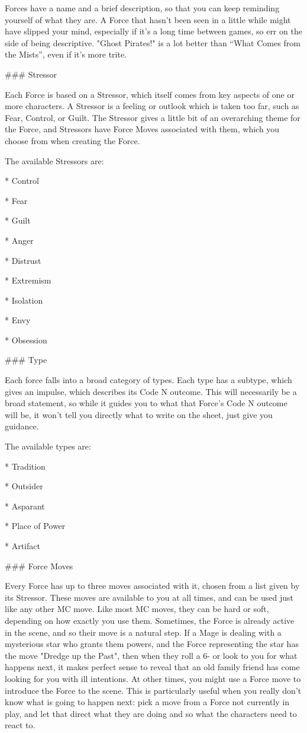 \documentclass[
  oneside,
  statementpaper,
  9pt]{memoir}
\begin{document}
\begin{MC}
Forces have a name and a brief description, so that you can keep reminding yourself of what they are. A Force that hasn’t been seen in a little while might have slipped your mind, especially if it’s a long time between games, so err on the side of being descriptive. "Ghost Pirates!" is a lot better than “What Comes from the Mists”, even if it’s more trite.

### Stressor

Each Force is based on a Stressor, which itself comes from key aspects of one or more characters. A Stressor is a feeling or outlook which is taken too far, such as Fear, Control, or Guilt. The Stressor gives a little bit of an overarching theme for the Force, and Stressors have Force Moves associated with them, which you choose from when creating the Force.

The available Stressors are:

* Control

* Fear

* Guilt

* Anger

* Distrust

* Extremism

* Isolation

* Envy

* Obsession

### Type

Each force falls into a broad category of types. Each type has a subtype, which gives an impulse, which describes its Code N outcome. This will necessarily be a broad statement, so while it guides you to what that Force’s Code N outcome will be, it won’t tell you directly what to write on the sheet, just give you guidance.

The available types are:

* Tradition

* Outsider

* Asparant

* Place of Power

* Artifact

### Force Moves

Every Force has up to three moves associated with it, chosen from a list given by its Stressor. These moves are available to you at all times, and can be used just like any other MC move. Like most MC moves, they can be hard or soft, depending on how exactly you use them. Sometimes, the Force is already active in the scene, and so their move is a natural step. If a Mage is dealing with a mysterious star who grants them powers, and the Force representing the star has the move "Dredge up the Past", then when they roll a 6- or look to you for what happens next, it makes perfect sense to reveal that an old family friend has come looking for you with ill intentions. At other times, you might use a Force move to introduce the Force to the scene. This is particularly useful when you really don’t know what is going to happen next: pick a move from a Force not currently in play, and let that direct what they are doing and so what the characters need to react to.


\end{MC}
\end{document}
